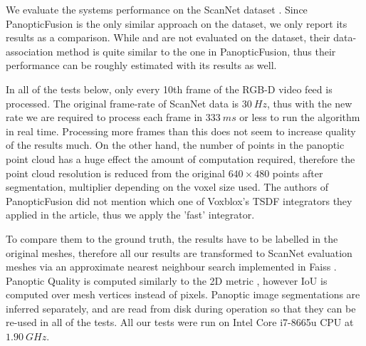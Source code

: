 

We evaluate the systems performance on the ScanNet dataset \cite{scannet}. Since PanopticFusion \cite{panopticfusion} is the only similar approach on the dataset, we only report its results as a comparison. While \cite{voxblox++} and  \cite{interactive_3d_scenes} are not evaluated on the dataset, their data-association method is quite similar to the one in PanopticFusion, thus their performance can be roughly estimated with its results as well.

In all of the tests below, only every 10th frame of the RGB-D video feed is processed. The original frame-rate of ScanNet data is $30~Hz$, thus with the new rate we are required to process each frame in $333~ms$ or less to run the algorithm in real time. Processing more frames than this does not seem to increase quality of the results much. On the other hand, the number of points in the panoptic point cloud has a huge effect the amount of computation required, therefore the point cloud resolution is reduced from the original $640 \times 480$ points after segmentation, multiplier depending on the voxel size used. The authors of PanopticFusion did not mention which one of Voxblox's TSDF integrators they applied in the article, thus we apply the 'fast' integrator.

To compare them to the ground truth, the results have to be labelled in the original meshes, therefore all our results are transformed to ScanNet evaluation meshes via an approximate nearest neighbour search implemented in Faiss \cite{faiss}. Panoptic Quality is computed similarly to the 2D metric \cite{panoptic_segmentation}, however IoU is computed over mesh vertices instead of pixels. Panoptic image segmentations are inferred separately, and are read from disk during operation so that they can be re-used in all of the tests. All our tests were run on Intel Core i7-8665u CPU at $1.90~GHz$.

